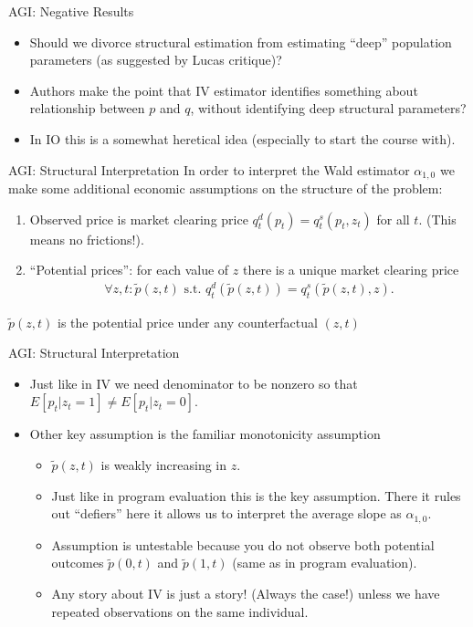 \documentclass[xcolor=pdftex,dvipsnames,table,mathserif]{beamer}
\begin{document}
\begin{frame}{AGI: Negative Results}
\begin{itemize}
\item Should we divorce structural estimation from estimating ``deep'' population parameters (as suggested by Lucas critique)?
\item Authors make the point that IV estimator identifies something about relationship between $p$ and $q$, without identifying deep structural parameters?
\item In IO this is a somewhat heretical idea (especially to start the course with).
\end{itemize}
\end{frame}

\begin{frame}{AGI: Structural Interpretation}
In order to interpret the Wald estimator $\alpha_{1,0}$ we make some additional \alert{economic} assumptions on the structure of the problem:
\begin{enumerate}
\item Observed price is market clearing price $q_t^d(p_t) = q_t^s(p_t,z_t)$ for all $t$. (This means no frictions!).
\item ``Potential prices'': for each value of $z$ there is a unique market clearing price
\begin{eqnarray*}
\forall z,t : \tilde{p}(z,t) \mbox{ s.t. } q_t^d(\tilde{p}(z,t)) = q_t^s(\tilde{p}(z,t),z).
\end{eqnarray*}
\end{enumerate}
$\tilde{p}(z,t)$ is the potential price under any counterfactual $(z,t)$
\end{frame}


\begin{frame}{AGI: Structural Interpretation}
\begin{itemize}
\item Just like in IV we need denominator to be nonzero so that
$E[p_t | z_t=1] \neq E[p_t | z_t = 0]$.
\item Other key assumption is the familiar \alert{monotonicity} assumption
\begin{itemize}
\item $\tilde{p}(z,t)$ is weakly increasing in $z$.
\item Just like in program evaluation this is the key assumption. There it rules out ``defiers'' here it allows us to interpret the \alert{average slope} as $\alpha_{1,0}$.
\item Assumption is untestable because you do not observe both potential outcomes $\tilde{p}(0,t)$ and $\tilde{p}(1,t)$ (same as in program evaluation).
\item Any story about IV is just a story! (Always the case!) unless we have repeated observations on the same individual.
\end{itemize}
\end{itemize}
\end{frame}
\end{document}
